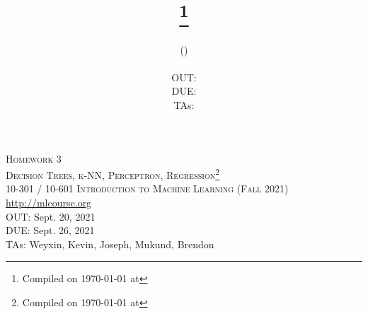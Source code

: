 \documentclass[11pt,addpoints,answers]{exam}
\title{\textsc{\hwNum}\\
\textsc{\hwTopic}
\thanks{Compiled on \today{} at \currenttime{}}\\
\vspace{1em}
} %
\author{\textsc{\large \courseNum{} \courseName{} (\courseSem)}\\
\courseUrl
\vspace{1em}\\
  OUT: \outDate \\
  DUE: \dueDate \\
  TAs: \taNames\\
}
\date{}
\date{}
\newcommand{\courseNum}{10-301 / 10-601}
\newcommand{\courseName}{Introduction to Machine Learning}
\newcommand{\courseSem}{Fall 2021}
\newcommand{\courseUrl}{\url{http://mlcourse.org}}
\newcommand{\hwNum}{Homework 3}
\newcommand{\hwTopic}{Decision Trees, k-NN, Perceptron, Regression}
\newcommand{\outDate}{Sept. 20, 2021}
\newcommand{\dueDate}{Sept. 26, 2021}
\newcommand{\taNames}{Weyxin, Kevin, Joseph, Mukund, Brendon}
\begin{document}
\section*{}
\begin{center}
  \textsc{\LARGE \hwNum} \\
  \textsc{\LARGE \hwTopic\footnote{Compiled on \today{} at \currenttime{}}} \\
  \vspace{1em}
  \textsc{\large \courseNum{} \courseName{} (\courseSem)} \\
  \courseUrl\\
  \vspace{1em}
  OUT: \outDate \\
  DUE: \dueDate \\
  TAs: \taNames
\end{center}
\end{document}
